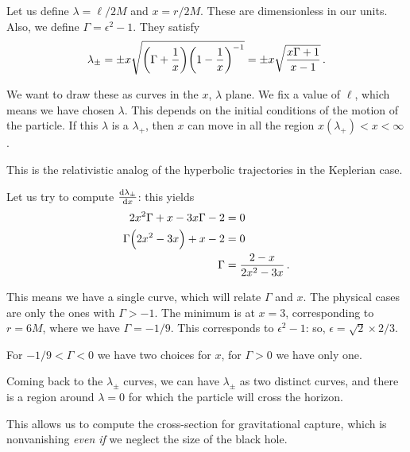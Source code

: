 \documentclass[main.tex]{subfiles}
\begin{document}
Let us define \(\lambda = \ell / 2M\) and \(x = r / 2M\). These are dimensionless in our units. Also, we define \(\Gamma = \epsilon^2- 1\). They satisfy 
%
\begin{align}
\lambda_{\pm} 
= \pm x \sqrt{\qty(\Gamma + \frac{1}{x}) \qty(1 - \frac{1}{x})^{-1}}
= \pm x \sqrt{\frac{x\Gamma + 1}{x-1}}
\,.
\end{align}

We want to draw these as curves in the  \(x\), \(\lambda \) plane. 
We fix a value of \(\ell\), which means we have chosen \(\lambda \). This depends on the initial conditions of the motion of the particle. 
If this \(\lambda \) is a \(\lambda _+\), then \(x\) can move in all the region \(x(\lambda _+)  < x < \infty \).

This is the relativistic analog of the hyperbolic trajectories in the Keplerian case. 

Let us try to compute \(\dv{\lambda_{\pm}}{x}\): this yields 
%
\begin{align}
2 x^2 \Gamma + x - 3 x \Gamma - 2 &= 0 \\
\Gamma \qty(2 x^2 - 3x) + x-2 &= 0  \\
\Gamma &= \frac{2-x}{2 x^2 - 3x}
\,.
\end{align}

This means we have a single curve, which will relate \(\Gamma \) and \(x\). 
The physical cases are only the ones with \(\Gamma > -1\). 
The minimum is at \(x = 3\), corresponding to \(r = 6M\), where we have \(\Gamma = - 1 /9\). This corresponds to \(\epsilon^2 - 1\): so, \(\epsilon = \sqrt{2} \times 2/3 \).

For \(- 1/9 < \Gamma < 0\) we have two choices for \(x\), for \(\Gamma > 0\) we have only one. 

Coming back to the \(\lambda_{\pm}\) curves, we can have \(\lambda_{\pm}\) as two distinct curves, and there is a region around \(\lambda = 0\) for which the particle will cross the horizon. 

This allows us to compute the cross-section for gravitational capture, which is nonvanishing \emph{even if} we neglect the size of the black hole. 

\end{document}
